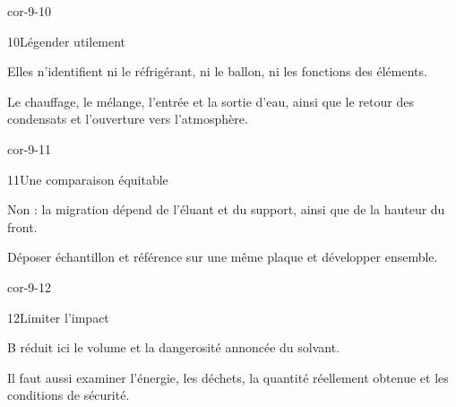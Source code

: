 \begin{blocLivre}{cor-9-10}\begin{corrige}{10}{Légender utilement}
\begin{questions}
\item Elles n’identifient ni le réfrigérant, ni le ballon, ni les fonctions des éléments.
\item Le chauffage, le mélange, l’entrée et la sortie d’eau, ainsi que le retour des condensats et l’ouverture vers l’atmosphère.
\end{questions}
\end{corrige}\end{blocLivre}
\begin{blocLivre}{cor-9-11}\begin{corrige}{11}{Une comparaison équitable}
\begin{questions}
\item Non : la migration dépend de l’éluant et du support, ainsi que de la hauteur du front.
\item Déposer échantillon et référence sur une même plaque et développer ensemble.
\end{questions}
\end{corrige}\end{blocLivre}
\begin{blocLivre}{cor-9-12}\begin{corrige}{12}{Limiter l’impact}
\begin{questions}
\item B réduit ici le volume et la dangerosité annoncée du solvant.
\item Il faut aussi examiner l’énergie, les déchets, la quantité réellement obtenue et les conditions de sécurité.
\end{questions}
\end{corrige}\end{blocLivre}

